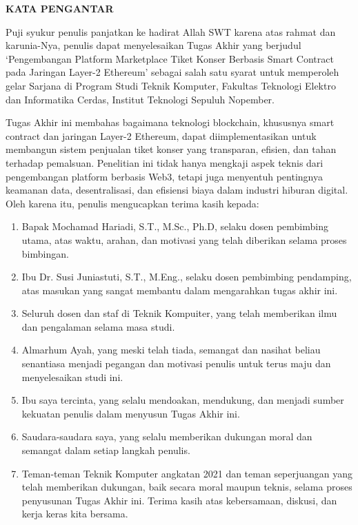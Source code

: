 \begin{center}
  \Large
  \textbf{KATA PENGANTAR}
\end{center}


\vspace{2ex}


Puji syukur penulis panjatkan ke hadirat Allah SWT karena atas rahmat dan
karunia-Nya, penulis dapat menyelesaikan Tugas Akhir yang berjudul
`Pengembangan Platform Marketplace Tiket Konser Berbasis Smart Contract pada
Jaringan Layer-2 Ethereum' sebagai salah satu syarat untuk memperoleh gelar
Sarjana di Program Studi Teknik Komputer, Fakultas Teknologi Elektro dan
Informatika Cerdas, Institut Teknologi Sepuluh Nopember.

Tugas Akhir ini membahas bagaimana teknologi blockchain, khususnya smart
contract dan jaringan Layer-2 Ethereum, dapat diimplementasikan untuk membangun
sistem penjualan tiket konser yang transparan, efisien, dan tahan terhadap
pemalsuan. Penelitian ini tidak hanya mengkaji aspek teknis dari pengembangan
platform berbasis Web3, tetapi juga menyentuh pentingnya keamanan data,
desentralisasi, dan efisiensi biaya dalam industri hiburan digital. Oleh karena
itu, penulis mengucapkan terima kasih kepada:

\begin{enumerate}[nolistsep]
  \item Bapak Mochamad Hariadi, S.T., M.Sc., Ph.D, selaku dosen pembimbing utama, atas
        waktu, arahan, dan motivasi yang telah diberikan selama proses bimbingan.
  \item Ibu Dr. Susi Juniastuti, S.T., M.Eng., selaku dosen pembimbing pendamping, atas
        masukan yang sangat membantu dalam mengarahkan tugas akhir ini.
  \item Seluruh dosen dan staf di Teknik Kompuiter, yang telah memberikan ilmu dan
        pengalaman selama masa studi.
  \item Almarhum Ayah, yang meski telah tiada, semangat dan nasihat beliau senantiasa
        menjadi pegangan dan motivasi penulis untuk terus maju dan menyelesaikan studi
        ini.
  \item Ibu saya tercinta, yang selalu mendoakan, mendukung, dan menjadi sumber
        kekuatan penulis dalam menyusun Tugas Akhir ini.
  \item Saudara-saudara saya, yang selalu memberikan dukungan moral dan semangat dalam
        setiap langkah penulis.
  \item Teman-teman Teknik Komputer angkatan 2021 dan teman seperjuangan yang telah
        memberikan dukungan, baik secara moral maupun teknis, selama proses penyusunan
        Tugas Akhir ini. Terima kasih atas kebersamaan, diskusi, dan kerja keras kita
        bersama.

\end{enumerate}

